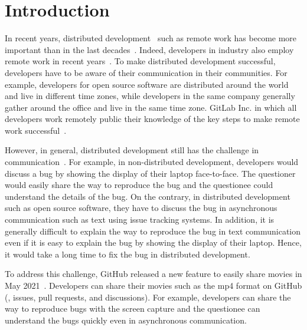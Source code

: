 \section{Introduction}
\label{sec:intro}
In recent years, distributed development~\citep{sengupta2006ICSE} 
such as remote work has become more important 
than in the last decades~\citep{ford2021TOSEM}. 
Indeed, developers in industry also employ remote work
in recent years~\citep{gitlab2020survey}.
To make distributed development successful, 
developers have to be aware of their communication 
in their communities. 
For example, developers for open source software are 
distributed around the world and live in different time zones, 
while developers in the same company generally gather around 
the office and live in the same time zone. 
GitLab Inc. in which all developers work remotely 
public their knowledge of the key steps 
to make remote work successful~\citep{gitlab2020remoteplaybook}. 


However, in general, distributed development still has 
the challenge in communication~\citep{ford2021TOSEM}. 
For example, in non-distributed development, 
developers would discuss a bug by showing the display of 
their laptop face-to-face. 
The questioner would easily share the way to reproduce the bug 
and the questionee could understand the details of the bug. 
On the contrary, in distributed development such as 
open source software, they have to discuss the bug 
in asynchronous communication 
such as text using issue tracking systems. 
In addition, it is generally difficult to explain the way 
to reproduce the bug in text communication 
even if it is easy to explain the bug by showing 
the display of their laptop. 
Hence, it would take a long time to fix the bug 
in distributed development. 


To address this challenge, GitHub released a new feature 
to easily share movies in May 2021~\citep{github-video-blog}. 
Developers can share their movies such as the mp4 format 
on GitHub (\eg,  issues, pull requests, and discussions). 
For example, developers can share the way to reproduce bugs 
with the screen capture and the questionee can understand 
the bugs quickly even in asynchronous communication. 


